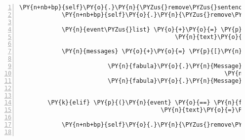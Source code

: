 \begin{Verbatim}[commandchars=\\\{\},numbers=left,firstnumber=1,stepnumber=1]
            \PY{n+nb+bp}{self}\PY{o}{.}\PY{n}{\PYZus{}remove\PYZus{}sentence}\PY{p}{(}\PY{n}{ID\PYZus{}KUNI}\PY{p}{,} \PY{l+s}{\PYZsq{}}\PY{l+s}{Hinter der Spinne ist doch irgendwas!}\PY{l+s}{\PYZsq{}}\PY{p}{)}
            \PY{n+nb+bp}{self}\PY{o}{.}\PY{n}{\PYZus{}remove\PYZus{}sentence}\PY{p}{(}\PY{n}{ID\PYZus{}CASSANDRA}\PY{p}{,} \PY{l+s}{\PYZsq{}}\PY{l+s}{Die Spinne verbirgt etwas!}\PY{l+s}{\PYZsq{}}\PY{p}{)}

            \PY{n}{event\PYZus{}list} \PY{o}{+}\PY{o}{=} \PY{p}{[}\PY{n}{fabula}\PY{o}{.}\PY{n}{SaysEvent}\PY{p}{(}\PY{n}{identifier}\PY{o}{=}\PY{n}{ID\PYZus{}CASSANDRA}\PY{p}{,}
                                            \PY{n}{text}\PY{o}{=}\PY{l+s}{\PYZsq{}}\PY{l+s}{Vielleicht kann ich sie weglocken!}\PY{l+s}{\PYZsq{}}\PY{p}{)}\PY{p}{]}

            \PY{n}{messages} \PY{o}{+}\PY{o}{=} \PY{p}{[}\PY{n}{fabula}\PY{o}{.}\PY{n}{Message}\PY{p}{(}\PY{p}{[}\PY{n}{fabula}\PY{o}{.}\PY{n}{TriesToMoveEvent}\PY{p}{(}\PY{n}{identifier}\PY{o}{=}\PY{n}{ID\PYZus{}CASSANDRA}\PY{p}{,}
                                                                 \PY{n}{target\PYZus{}identifier}\PY{o}{=}\PY{p}{(}\PY{l+m+mi}{1}\PY{p}{,} \PY{l+m+mi}{4}\PY{p}{)}\PY{p}{)}\PY{p}{]}\PY{p}{)}\PY{p}{,}
                         \PY{n}{fabula}\PY{o}{.}\PY{n}{Message}\PY{p}{(}\PY{p}{[}\PY{n}{fabula}\PY{o}{.}\PY{n}{SaysEvent}\PY{p}{(}\PY{n}{identifier}\PY{o}{=}\PY{n}{ID\PYZus{}CASSANDRA}\PY{p}{,}
                                                          \PY{n}{text}\PY{o}{=}\PY{l+s}{\PYZsq{}}\PY{l+s}{Oh ein einzelner Spinnweben}\PY{l+s}{\PYZsq{}}\PY{p}{)}\PY{p}{]}\PY{p}{)}\PY{p}{,}
                         \PY{n}{fabula}\PY{o}{.}\PY{n}{Message}\PY{p}{(}\PY{p}{[}\PY{n}{fabula}\PY{o}{.}\PY{n}{TriesToPickUpEvent}\PY{p}{(}\PY{n}{identifier}\PY{o}{=}\PY{n}{ID\PYZus{}CASSANDRA}\PY{p}{,}
                                                                   \PY{n}{target\PYZus{}identifier}\PY{o}{=}\PY{l+s}{\PYZsq{}}\PY{l+s}{cobweb}\PY{l+s}{\PYZsq{}}\PY{p}{)}\PY{p}{]}\PY{p}{)}\PY{p}{]}

        \PY{k}{elif} \PY{p}{(}\PY{n}{event} \PY{o}{==} \PY{n}{fabula}\PY{o}{.}\PY{n}{SaysEvent}\PY{p}{(}\PY{n}{identifier}\PY{o}{=}\PY{n}{ID\PYZus{}KUNI}\PY{p}{,}
                                        \PY{n}{text}\PY{o}{=}\PY{l+s}{\PYZsq{}}\PY{l+s}{Ich hab den Eingang zum Gnomenweg gefunden! Aber er ist verschlossen.}\PY{l+s}{\PYZsq{}}\PY{p}{)}\PY{p}{)}\PY{p}{:}

            \PY{n+nb+bp}{self}\PY{o}{.}\PY{n}{\PYZus{}remove\PYZus{}sentence}\PY{p}{(}\PY{n}{ID\PYZus{}KUNI}\PY{p}{,} \PY{n}{event}\PY{o}{.}\PY{n}{text}\PY{p}{)}


\end{Verbatim}
